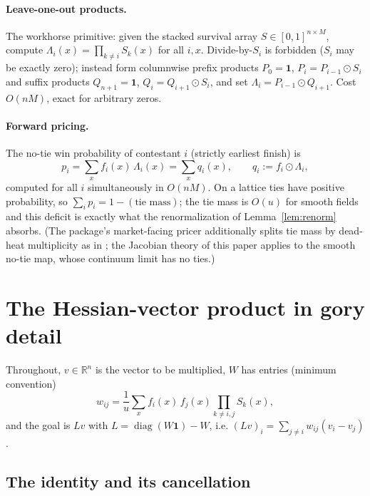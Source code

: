 \documentclass[11pt]{article}
\theoremstyle{definition}
\theoremstyle{remark}
\newcommand{\R}{\mathbb{R}}
\newcommand{\one}{\mathbf{1}}
\DeclareMathOperator{\diag}{diag}
\begin{document}
\paragraph{Leave-one-out products.}
The workhorse primitive: given the stacked survival array
$S \in [0,1]^{n \times M}$, compute
$\Lambda_i(x) = \prod_{k \ne i} S_k(x)$ for all $i, x$.  Divide-by-$S_i$ is
forbidden ($S_i$ may be exactly zero); instead form columnwise prefix
products $P_0 = \one$, $P_i = P_{i-1} \odot S_i$ and suffix products
$Q_{n+1} = \one$, $Q_i = Q_{i+1} \odot S_i$, and set
$\Lambda_i = P_{i-1} \odot Q_{i+1}$.  Cost $O(nM)$, exact for arbitrary
zeros.

\paragraph{Forward pricing.}
The no-tie win probability of contestant $i$ (strictly earliest finish) is
\begin{equation}
  p_i = \sum_x f_i(x)\,\Lambda_i(x)
  = \sum_x q_i(x),
  \qquad q_i := f_i \odot \Lambda_i,
  \label{eq:lattice-forward}
\end{equation}
computed for all $i$ simultaneously in $O(nM)$.  On a lattice ties have
positive probability, so $\sum_i p_i = 1 - (\text{tie mass})$; the tie mass
is $O(u)$ for smooth fields and this deficit is exactly what the
renormalization of Lemma~\ref{lem:renorm} absorbs.  (The package's
market-facing pricer additionally splits tie mass by dead-heat multiplicity
as in \textcite{cotton2021}; the Jacobian theory of this paper applies to
the smooth no-tie map, whose continuum limit has no ties.)

\section{The Hessian-vector product in gory detail}
\label{app:hvp}

Throughout, $v \in \R^n$ is the vector to be multiplied,
$W$ has entries (minimum convention)
\begin{equation}
  w_{ij} = \frac{1}{u}\sum_x f_i(x)\, f_j(x) \prod_{k \ne i,j} S_k(x),
  \label{eq:lattice-w}
\end{equation}
and the goal is $Lv$ with $L = \diag(W\one) - W$, i.e.
$(Lv)_i = \sum_{j\ne i} w_{ij}(v_i - v_j)$.

\subsection{The identity and its cancellation}
\end{document}
